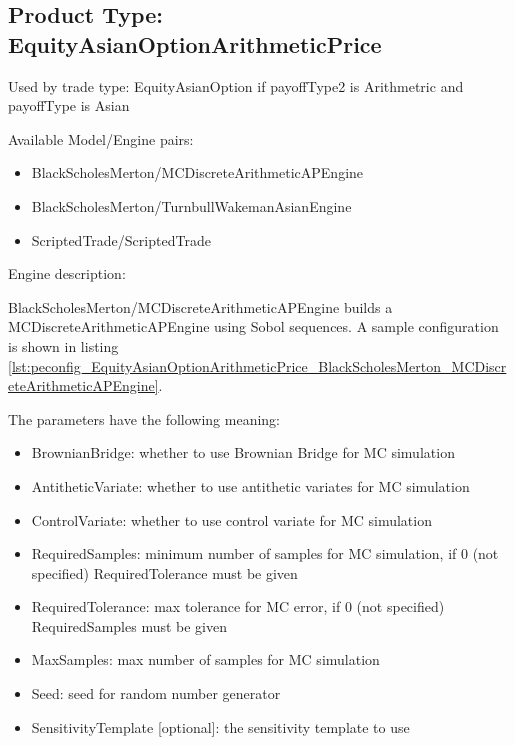 \subsection{Product Type: EquityAsianOptionArithmeticPrice}

Used by trade type: EquityAsianOption if payoffType2 is Arithmetric and payoffType is Asian

Available Model/Engine pairs:

\begin{itemize}
  \item BlackScholesMerton/MCDiscreteArithmeticAPEngine
  \item BlackScholesMerton/TurnbullWakemanAsianEngine
  \item ScriptedTrade/ScriptedTrade
\end{itemize}

Engine description:

BlackScholesMerton/MCDiscreteArithmeticAPEngine builds a MCDiscreteArithmeticAPEngine using Sobol sequences. A sample
configuration is shown in listing
\ref{lst:peconfig_EquityAsianOptionArithmeticPrice_BlackScholesMerton_MCDiscreteArithmeticAPEngine}.

The parameters have the following meaning:

\begin{itemize}
\item BrownianBridge: whether to use Brownian Bridge for MC simulation
\item AntitheticVariate: whether to use antithetic variates for MC simulation
\item ControlVariate: whether to use control variate for MC simulation
\item RequiredSamples: minimum number of samples for MC simulation, if 0 (not specified) RequiredTolerance must be given
\item RequiredTolerance: max tolerance for MC error, if 0 (not specified) RequiredSamples must be given
\item MaxSamples: max number of samples for MC simulation
\item Seed: seed for random number generator
\item SensitivityTemplate [optional]: the sensitivity template to use
\end{itemize}

